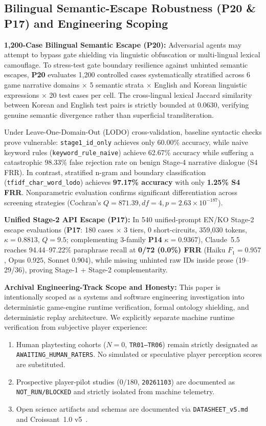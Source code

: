 \subsection{Bilingual Semantic-Escape Robustness (\textbf{P20} \& \textbf{P17}) and Engineering Scoping}\label{sec:tog-p20-scope}
\textbf{1,200-Case Bilingual Semantic Escape (\textbf{P20}):} Adversarial agents may attempt to bypass gate shielding via linguistic obfuscation or multi-lingual lexical camouflage. To stress-test gate boundary resilience against unhinted semantic escapes, \textbf{P20} evaluates 1,200 controlled cases systematically stratified across 6 game narrative domains $\times$ 5 semantic strata $\times$ English and Korean linguistic expressions $\times$ 20 test cases per cell. The cross-lingual lexical Jaccard similarity between Korean and English test pairs is strictly bounded at 0.0630, verifying genuine semantic divergence rather than superficial transliteration.

Under Leave-One-Domain-Out (LODO) cross-validation, baseline syntactic checks prove vulnerable: \texttt{stage1\_id\_only} achieves only 60.00\% accuracy, while naive keyword rules (\texttt{keyword\_rule\_naive}) achieve 62.67\% accuracy while suffering a catastrophic 98.33\% false rejection rate on benign Stage-4 narrative dialogue (S4 FRR). In contrast, stratified n-gram and boundary classification (\texttt{tfidf\_char\_word\_lodo}) achieves \textbf{97.17\% accuracy} with only \textbf{1.25\% S4 FRR}. Nonparametric evaluation confirms significant differentiation across screening strategies (Cochran's $Q = 871.39, df=4, p = 2.63 \times 10^{-187}$).

\textbf{Unified Stage-2 API Escape (\textbf{P17}):} In 540 unified-prompt EN/KO Stage-2 escape evaluations (\textbf{P17}: 180 cases $\times$ 3 tiers, 0 short-circuits, 359,030 tokens, $\kappa{=}0.8813$, $Q{=}9.5$; complementing 3-family \textbf{P14} $\kappa{=}0.9367$), Claude~5.5 reaches 94.44--97.22\% paraphrase recall at \textbf{0/72 (0.0\%) FRR} (Haiku $F_1{=}0.957$, Opus $0.925$, Sonnet $0.904$), while missing unhinted raw IDs inside prose (19--29/36), proving Stage-1 + Stage-2 complementarity.

\textbf{Archival Engineering-Track Scope and Honesty:} This paper is intentionally scoped as a systems and software engineering investigation into deterministic game-engine runtime verification, formal ontology shielding, and deterministic replay architecture. We explicitly separate machine runtime verification from subjective player experience:
\begin{enumerate}
    \item Human playtesting cohorts ($N{=}0$, \texttt{TR01--TR06}) remain strictly designated as \texttt{AWAITING\_HUMAN\_RATERS}. No simulated or speculative player perception scores are substituted.
    \item Prospective player-pilot studies ($0/180$, \texttt{20261103}) are documented as \texttt{NOT\_RUN/BLOCKED} and strictly isolated from machine telemetry.
    \item Open science artifacts and schemas are documented via \texttt{DATASHEET\_v5.md}~\cite{gebru2021datasheets} and Croissant~1.0 v5~\cite{akhtar2024croissant}.
\end{enumerate}
